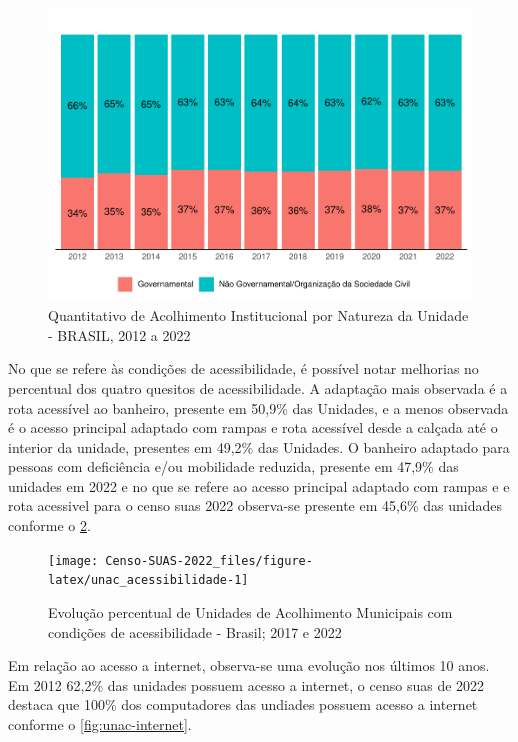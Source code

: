 \documentclass[
  brazilian]{report}
\begin{document}
\begin{figure}
\includegraphics{Censo-SUAS-2022_files/figure-latex/acolh_nat-1} \caption[Quantitativo de Acolhimento Institucional por Natureza da Unidade - BRASIL, 2012 a 2022]{Quantitativo de Acolhimento Institucional por Natureza da Unidade - BRASIL, 2012 a 2022}\label{fig:acolh_nat}
\end{figure}

No que se refere às condições de acessibilidade, é possível notar
melhorias no percentual dos quatro quesitos de acessibilidade. A
adaptação mais observada é a rota acessível ao banheiro, presente em
50,9\% das Unidades, e a menos observada é o acesso principal adaptado
com rampas e rota acessível desde a calçada até o interior da unidade,
presentes em 49,2\% das Unidades. O banheiro adaptado para pessoas com
deficiência e/ou mobilidade reduzida, presente em 47,9\% das unidades em
2022 e no que se refere ao acesso principal adaptado com rampas e e rota
acessivel para o censo suas 2022 observa-se presente em 45,6\% das
unidades conforme o \cref{fig:unac_acessibilidade}.

\begin{figure}
\texttt{[image: Censo-SUAS-2022\_files/figure-latex/unac\_acessibilidade-1]} \caption[Evolução percentual de Unidades de Acolhimento Municipais com condições de acessibilidade - Brasil]{Evolução percentual de Unidades de Acolhimento Municipais com condições de acessibilidade - Brasil; 2017 e 2022}\label{fig:unac_acessibilidade}
\end{figure}

Em relação ao acesso a internet, observa-se uma evolução nos últimos 10
anos. Em 2012 62,2\% das unidades possuem acesso a internet, o censo
suas de 2022 destaca que 100\% dos computadores das undiades possuem
acesso a internet conforme o \cref{fig:unac-internet}.
\end{document}
